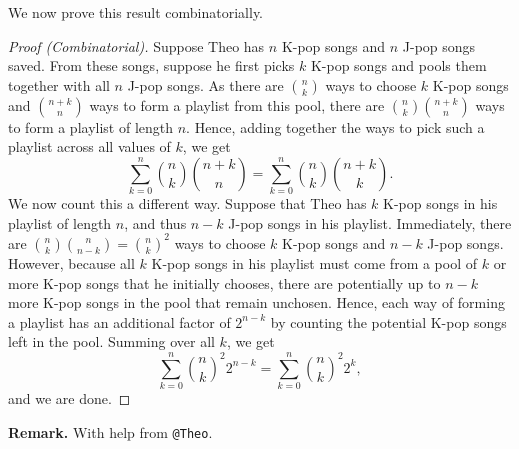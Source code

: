 \documentclass[12pt]{article}
\begin{document}
\newpage
We now prove this result combinatorially.
\begin{proof}[Proof (Combinatorial)]
	Suppose Theo has $n$ K-pop songs and $n$ J-pop songs saved.
	From these songs, suppose he first picks $k$ K-pop songs and pools them together with all $n$ J-pop songs.
  As there are $\binom{n}{k}$ ways to choose $k$ K-pop songs and $\binom{n+k}{n}$ ways to form a playlist from this pool, there are $\binom{n}{k}\binom{n+k}{n}$ ways to form a playlist of length $n$.
	Hence, adding together the ways to pick such a playlist across all values of $k$, we get
	\[\sum^{n}_{k=0}\binom{n}{k}\binom{n+k}{n} = \sum^{n}_{k=0}\binom{n}{k}\binom{n+k}{k}.\]
	We now count this a different way.
	Suppose that Theo has $k$ K-pop songs in his playlist of length $n$, and thus $n-k$ J-pop songs in his playlist.
	Immediately, there are $\binom{n}{k}\binom{n}{n-k}=\binom{n}{k}^2$ ways to choose $k$ K-pop songs and $n-k$ J-pop songs.
	However, because all $k$ K-pop songs in his playlist must come from a pool of $k$ or more K-pop songs that he initially chooses, there are potentially up to $n-k$ more K-pop songs in the pool that remain unchosen.
	Hence, each way of forming a playlist has an additional factor of $2^{n-k}$ by counting the potential K-pop songs left in the pool.
	Summing over all $k$, we get
	\[\sum^{n}_{k=0}\binom{n}{k}^2 2^{n-k} = \sum^{n}_{k=0}\binom{n}{k}^2 2^{k},\]
	and we are done.
\end{proof}
\textbf{Remark.} With help from \texttt{@Theo}.
\end{document}
